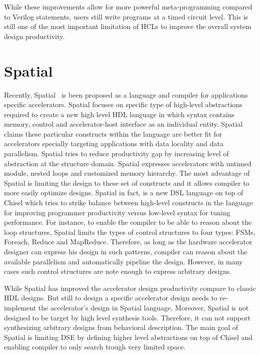 While these improvements allow for more powerful meta-programming compared to Verilog  statements, users still write programs at a timed circuit level. This is still one of the most important limitation of HCLs to improve the overall system design productivity.

\section{Spatial}
Recently, Spatial~\cite{david_PLDI_2018_spatial} is been proposed as a language and compiler for applications specific accelerators.
Spatial focuses on specific type of high-level abstractions required to create a new high level HDL language in which syntax contains memory, control and accelerator-host interface as an individual entity.
Spatial claims these particular constructs within the language are better fit for accelerators specially targeting applications with data locality and data parallelism.
Spatial tries to reduce productivity gap by increasing level of abstraction at the structure domain. Spatial expresses accelerators with untimed module, nested loops and customized memory hierarchy.
The most advantage of Spatial is limiting the design to these set of constructs and it allows compiler to more easily optimize designs.
Spatial in fact, is a new DSL language on top of Chisel which tries to strike balance between high-level constructs in the language for improving programmer productivity versus low-level syntax for tuning performance. 
For instance, to enable the compiler to be able to reason about the loop structures, Spatial limits the types of control structures to four types: FSMs, Foreach, Reduce and MapReduce. 
Therefore, as long as the hardware accelerator designer can express his design in such patterns, compiler can reason about the available parallelism and automatically pipeline the design.
However, in many cases such control structures are note enough to express arbitrary designs.

While Spatial has improved the accelerator design productivity compare to classic HDL designs.
But still to design a specific accelerator design needs to re-implement the accelerator's design in Spatial language. Moreover, Spatial is not designed to be target by high level synthesis tools.
Therefore, it can not support synthesizing arbitrary designs from behavioral description.
The main goal of Spatial is limiting DSE by defining higher level abstractions on top of Chisel and enabling compiler to only search trough very limited space.

